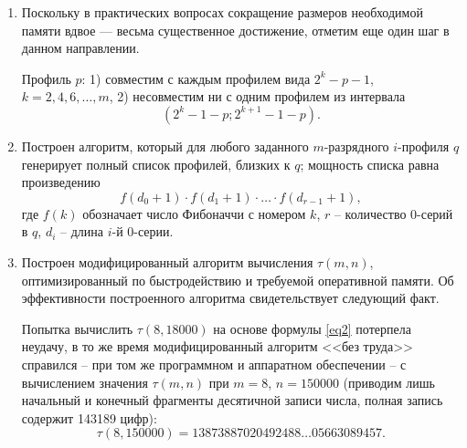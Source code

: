 \begin{enumerate}
\item
Поскольку в практических вопросах сокращение размеров необходимой памяти вдвое --- весьма существенное достижение, отметим еще один шаг в данном направлении.

Профиль $p$: 
1) совместим с каждым профилем вида $2^k-p-1$, $k=2,4,6,\dots,m$,
2) несовместим ни с одним профилем из интервала
$$(2^k-1-p ; 2^{k+1}-1-p).$$

\item
Построен алгоритм, который для любого заданного $m$-разрядного $i$-профиля $q$ генерирует полный список профилей, близких к $q$;
мощность списка равна произведению
$$f(d_0+1) \cdot  f(d_1+1)\cdot \dots \cdot  f(d_{r-1}+1),$$
где $f(k)$ обозначает число Фибоначчи с номером $k$, $r$ -- количество 0-серий в $q$, $d_i$ -- длина $i$-й 0-серии.
\item 
Построен модифицированный алгоритм вычисления $\tau(m,n)$, оптимизированный по быстродействию и требуемой оперативной памяти.
Об эффективности построенного алгоритма свидетельствует следующий факт.

Попытка вычислить $\tau(8,18000)$ на основе формулы \eqref{eq2} потерпела неудачу, в то же время модифицированный алгоритм <<без труда>> справился -- при том же программном и аппаратном обеспечении -- с вычислением значения $\tau(m,n)$ при $m=8$, $n=150000$ (приводим лишь начальный и конечный фрагменты десятичной записи числа, полная запись содержит 143189 цифр):
$$\tau(8,150000)=13873887020492488 \dots 05663089457. $$

\end{enumerate}


